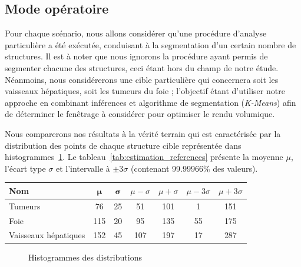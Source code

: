 \subsection{Mode opératoire}		
	Pour chaque scénario, nous allons considérer qu'une procédure d'analyse particulière a été exécutée, conduisant à la segmentation d'un certain nombre de structures. Il est à noter que nous ignorons la procédure ayant permis de segmenter chacune des structures, ceci étant hors du champ de notre étude. Néanmoins, nous considérerons une cible particulière qui concernera soit les vaisseaux hépatiques, soit les tumeurs du foie ; l'objectif étant d'utiliser notre approche en combinant inférences et algorithme de segmentation (\emph{K-Means}) afin de déterminer le fenêtrage à considérer pour optimiser le rendu volumique. 
	
	Nous comparerons nos résultats à la vérité terrain qui est caractérisée par la distribution des points de chaque structure cible représentée dans histogrammes~\ref{fig:3_histo_medical}. Le tableau~\ref{tab:estimation_references} présente la moyenne $\mu$, l'écart type $\sigma$ et l'intervalle à $\pm3\sigma$ (contenant 99.99966\% des valeurs).

	\begin{center}
		\begin{tabular}{|l|cccccc|}
			\hline
			\textbf{Nom}			& $\boldsymbol\mu$	& $\boldsymbol\sigma$	& $\mu-\sigma$ & $\mu+\sigma$	& $\mu-3\sigma$ & $\mu+3\sigma$ \\
			\hline
				Tumeurs				&  76 				& 25 					& 51 			& 101			&  1 		& 151 		 \\
			 	Foie 				& 115 				& 20 					& 95 			& 135 			& 55 		& 175		 \\
			 	Vaisseaux hépatiques& 152 				& 45 					& 107 			& 197			& 17 		& 287 		 \\
			 \hline	
		\end{tabular}
		\label{tab:estimation_references}
	\end{center}
	
	
		\begin{figure}[!ht]	%
		  \centering
			\caption{Histogrammes des distributions}		  
			\label{fig:3_histo_medical}
		\end{figure}

